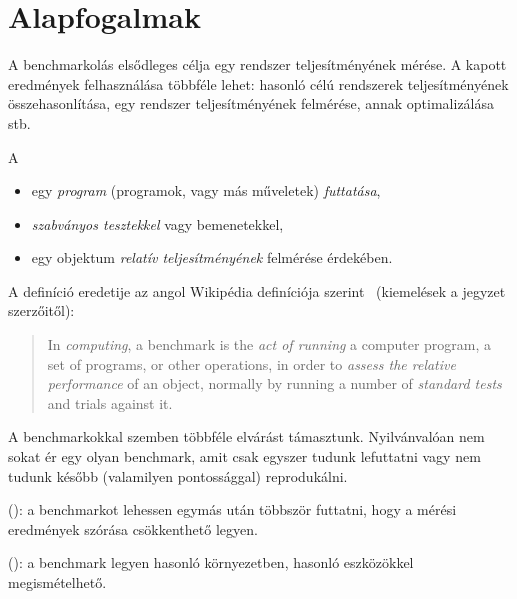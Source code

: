 \section{Alapfogalmak}

A benchmarkolás elsődleges célja egy rendszer teljesítményének mérése. A kapott eredmények felhasználása többféle lehet: hasonló célú rendszerek teljesítményének összehasonlítása,  egy rendszer teljesítményének felmérése, annak optimalizálása stb.

\begin{definicio}
	A 
	\begin{itemize}
		\item egy \emph{program} (programok, vagy más műveletek) \emph{futtatása},
		\item \emph{szabványos tesztekkel} vagy bemenetekkel,
		\item egy objektum \emph{relatív teljesítményének} felmérése érdekében.
	\end{itemize}
\end{definicio}

\begin{megjegyzes}
A definíció eredetije az angol Wikipédia definíciója szerint~\cite{wiki:benchmark} (kiemelések a jegyzet szerzőitől):

\begin{quote}
	In \emph{computing}, a benchmark is the \emph{act of running} a computer program, a set of programs, or other operations, in order to \emph{assess the relative performance} of an object, normally by running a number of \emph{standard tests} and trials against it.
\end{quote}
\end{megjegyzes}

A benchmarkokkal szemben többféle elvárást támasztunk. Nyilvánvalóan nem sokat ér egy olyan benchmark, amit csak egyszer tudunk lefuttatni vagy nem tudunk később (valamilyen pontossággal) reprodukálni.

\begin{definicio}
	 (): a benchmarkot lehessen egymás után többször futtatni, hogy a mérési eredmények szórása csökkenthető legyen.
\end{definicio}

\begin{definicio}
	 (): a benchmark legyen hasonló környezetben, hasonló eszközökkel megismételhető.
\end{definicio}

